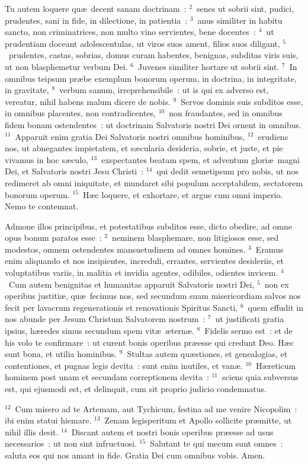 \lettrine[lines=3,image=true,loversize=0.05,lraise=-0.03]{T}{}u autem loquere qu\ae\ decent sanam doctrinam~:
${}^{2}$~senes ut sobrii sint, pudici, prudentes, sani in fide, in dilectione, in patientia~:
${}^{3}$~anus similiter in habitu sancto, non criminatrices, non multo vino servientes, bene docentes~:
${}^{4}$~ut prudentiam doceant adolescentulas, ut viros suos ament, filios suos diligant,
${}^{5}$~prudentes, castas, sobrias, domus curam habentes, benignas, subditas viris suis, ut non blasphemetur verbum Dei.
${}^{6}$~Juvenes similiter hortare ut sobrii sint.
${}^{7}$~In omnibus teipsum pr\ae be exemplum bonorum operum, in doctrina, in integritate, in gravitate,
${}^{8}$~verbum sanum, irreprehensibile~: ut is qui ex adverso est, vereatur, nihil habens malum dicere de nobis.
${}^{9}$~Servos dominis suis subditos esse, in omnibus placentes, non contradicentes,
${}^{10}$~non fraudantes, sed in omnibus fidem bonam ostendentes~: ut doctrinam Salvatoris nostri Dei ornent in omnibus.
${}^{11}$~Apparuit enim gratia Dei Salvatoris nostri omnibus hominibus,
${}^{12}$~erudiens nos, ut abnegantes impietatem, et s\ae cularia desideria, sobrie, et juste, et pie vivamus in hoc s\ae culo,
${}^{13}$~exspectantes beatam spem, et adventum glori\ae\ magni Dei, et Salvatoris nostri Jesu Christi~:
${}^{14}$~qui dedit semetipsum pro nobis, ut nos redimeret ab omni iniquitate, et mundaret sibi populum acceptabilem, sectatorem bonorum operum.
${}^{15}$~H\ae c loquere, et exhortare, et argue cum omni imperio. Nemo te contemnat.

\lettrine[lines=3,image=true,loversize=0.05,lraise=-0.03]{A}{}dmone illos principibus, et potestatibus subditos esse, dicto obedire, ad omne opus bonum paratos esse~:
${}^{2}$~neminem blasphemare, non litigiosos esse, sed modestos, omnem ostendentes mansuetudinem ad omnes homines.
${}^{3}$~Eramus enim aliquando et nos insipientes, increduli, errantes, servientes desideriis, et voluptatibus variis, in malitia et invidia agentes, odibiles, odientes invicem.
${}^{4}$~Cum autem benignitas et humanitas apparuit Salvatoris nostri Dei,
${}^{5}$~non ex operibus justiti\ae , qu\ae\ fecimus nos, sed secundum suam misericordiam salvos nos fecit per lavacrum regenerationis et renovationis Spiritus Sancti,
${}^{6}$~quem effudit in nos abunde per Jesum Christum Salvatorem nostrum~:
${}^{7}$~ut justificati gratia ipsius, h\ae redes simus secundum spem vit\ae\ \ae tern\ae .
${}^{8}$~Fidelis sermo est~: et de his volo te confirmare~: ut curent bonis operibus pr\ae esse qui credunt Deo. H\ae c sunt bona, et utilia hominibus.
${}^{9}$~Stultas autem qu\ae stiones, et genealogias, et contentiones, et pugnas legis devita~: sunt enim inutiles, et van\ae .
${}^{10}$~H\ae reticum hominem post unam et secundam correptionem devita~:
${}^{11}$~sciens quia subversus est, qui ejusmodi est, et delinquit, cum sit proprio judicio condemnatus.


${}^{12}$~Cum misero ad te Artemam, aut Tychicum, festina ad me venire Nicopolim~: ibi enim statui hiemare.
${}^{13}$~Zenam legisperitum et Apollo sollicite pr\ae mitte, ut nihil illis desit.
${}^{14}$~Discant autem et nostri bonis operibus pr\ae esse ad usus necessarios~: ut non sint infructuosi.
${}^{15}$~Salutant te qui mecum sunt omnes~: saluta eos qui nos amant in fide. Gratia Dei cum omnibus vobis. Amen.
